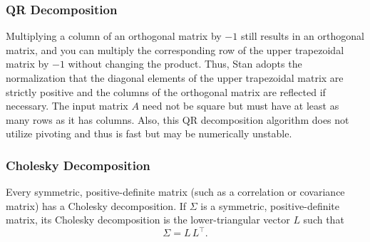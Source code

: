 %
%
%

\subsubsection{QR Decomposition}\label{QR-decomposition}

\begin{description}
%
%
%
\end{description}
%
Multiplying a column of an orthogonal matrix by $-1$ still results in 
an orthogonal matrix, and you can multiply the corresponding row of 
the upper trapezoidal matrix by $-1$ without changing the product. Thus,
Stan adopts the normalization that the diagonal elements of the upper
trapezoidal matrix are strictly positive and the columns of the 
orthogonal matrix are reflected if necessary. The input matrix $A$ need
not be square but must have at least as many rows as it has columns.
Also, this QR decomposition algorithm does not utilize pivoting and 
thus is fast but may be numerically unstable.

\subsubsection{Cholesky Decomposition}

Every symmetric, positive-definite matrix (such as a correlation or
covariance matrix) has a Cholesky decomposition.  If $\Sigma$ is a
symmetric, positive-definite matrix, its Cholesky decomposition is the
lower-triangular vector $L$ such that
\[
\Sigma = L \, L^{\top}.
\]

\begin{description}
%
% 
\end{description}

